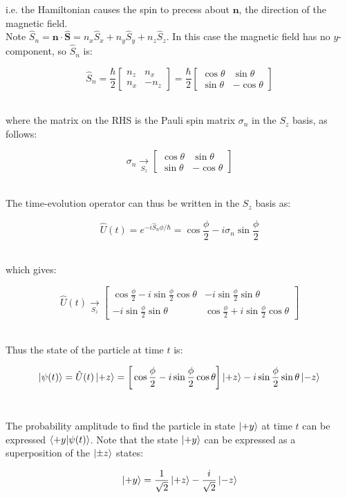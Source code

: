 \documentclass[9pt]{extarticle}
\renewcommand{\v}[1]{{\bm #1}}
\newcommand{\hv}[1]{\hat{\bm{#1}}}
\begin{document}
\begin{multicols*}{2}
i.e. the Hamiltonian causes the spin to precess about $\v n$, the direction of the magnetic field. \\ 

Note $\hat S_n = \v n \cdot \hv S = n_x \hat S_x + n_y \hat S_y + n_z \hat S_z$. In this case the magnetic field has no $y$-component, so $\hat S_n$ is:

$$\hat S_n = \frac \hbar 2\begin{bmatrix} n_z & n_x \\ n_x & -n_z \end{bmatrix} = \frac \hbar 2 \begin{bmatrix} \cos\theta & \sin\theta \\ \sin\theta & -\cos\theta \end{bmatrix}$$ \ 

where the matrix on the RHS is the Pauli spin matrix $\sigma_n$ in the $S_z$ basis, as follows: 

$$\sigma_n \xrightarrow[S_z]{} \begin{bmatrix} \cos\theta & \sin\theta \\ \sin\theta & -\cos\theta \end{bmatrix}$$ \ 

The time-evolution operator can thus be written in the $S_z$ basis as:

$$\hat U(t) = e^{-i \hat S_n \phi / \hbar} = \cos \frac \phi 2 - i\sigma_n \sin \frac \phi 2$$ \ 

which gives:

$$\hat U(t) \xrightarrow[S_z]{} 
\begin{bmatrix}
	\cos \frac \phi 2 - i\sin \frac \phi 2 \cos\theta & -i\sin\frac \phi 2 \sin\theta \\ 
	-i\sin\frac \phi 2 \sin\theta & \cos \frac \phi 2 + i\sin\frac \phi 2\cos\theta
\end{bmatrix}
$$ \ 

Thus the state of the particle at time $t$ is:

$$\ket{\psi(t)} = \hat U(t) \ket{+z} = \bigg[ \cos \frac \phi 2 - i\sin\frac \phi 2 \cos\theta \bigg] \ket{+z} - i\sin\frac \phi 2 \sin\theta \ket{-z}$$ \ 

The probability amplitude to find the particle in state $\ket{+y}$ at time $t$ can be expressed $\bra{+y}\ket{\psi(t)}$. Note that the state $\ket{+y}$ can be expressed as a superposition of the $\ket{\pm z}$ states:

$$\ket{+y} = \frac{1}{\sqrt 2} \ket{+z} - \frac{i}{\sqrt 2} \ket{-z}$$ \ 


\end{multicols*}
\end{document}
